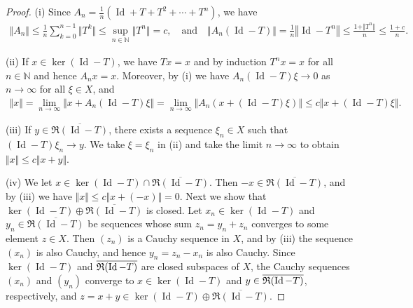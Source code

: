 \documentclass{article}
\numberwithin{equation}{section}
\newcommand{\bbN}{\mathbb{N}}
\newcommand{\ol}{\overline}
\DeclareMathOperator{\id}{Id}
\theoremstyle{plain}
\theoremstyle{definition}
\begin{document}
\begin{proof}
(i) Since $A_n=\frac{1}{n}(\id+T+T^2+\cdots+T^n)$, we have
\begin{align*}
	\Vert A_n\Vert\leq\frac{1}{n}\sum_{k=0}^{n-1}\Vert T^k\Vert\leq\sup_{n\in\bbN}\Vert T^n\Vert=c,\quad\text{and}\quad
	\Vert A_n(\id-T)\Vert=\frac{1}{n}\left\Vert\id-T^n\right\Vert\leq\frac{1+\Vert T^n\Vert}{n}\leq\frac{1+c}{n}.
\end{align*}
\item (ii) If $x\in\ker(\id-T)$, we have $Tx=x$ and by induction $T^nx=x$ for all $n\in\bbN$ and hence $A_nx=x$. Moreover, by (i) we have $A_n(\id-T)\xi\to 0$ as $n\to\infty$ for all $\xi\in X$, and
\begin{align*}
	\Vert x\Vert=\lim_{n\to\infty}\Vert x+A_n(\id-T)\xi\Vert=\lim_{n\to\infty}\Vert A_n(x+(\id-T)\xi)\Vert\leq c\Vert x+(\id-T)\xi\Vert.
\end{align*}
\item (iii) If $y\in\ol{\mathfrak{R}(\id-T)}$, there exists a sequence $\xi_n\in X$ such that $(\id-T)\xi_n\to y$. We take $\xi=\xi_n$ in (ii) and take the limit $n\to\infty$ to obtain $\Vert x\Vert\leq c\Vert x+y\Vert$.

\item (iv) We let $x\in\ker(\id-T)\cap\ol{\mathfrak{R}(\id-T)}$. Then $-x\in\ol{\mathfrak{R}(\id-T)}$, and by (iii) we have $\Vert x\Vert\leq c\Vert x+(-x)\Vert=0$. Next we show that $\ker(\id-T)\oplus\ol{\mathfrak{R}(\id-T)}$ is closed. Let $x_n\in\ker(\id-T)$ and $y_n\in\ol{\mathfrak{R}(\id-T)}$ be sequences whose sum $z_n=y_n+z_n$ converges to some element $z\in X$. Then $(z_n)$ is a Cauchy sequence in $X$, and by (iii) the sequence $(x_n)$ is also Cauchy, and hence $y_n=z_n-x_n$ is also Cauchy. Since $\ker(\id-T)$ and $\ol{\frak{R}(\id-T)}$ are closed subspaces of $X$, the Cauchy sequences $(x_n)$ and $(y_n)$ converge to $x\in\ker(\id-T)$ and $y\in\ol{\frak{R}(\id-T)}$, respectively, and $z=x+y\in\ker(\id-T)\oplus\ol{\mathfrak{R}(\id-T)}$.


\end{proof}
\end{document}
